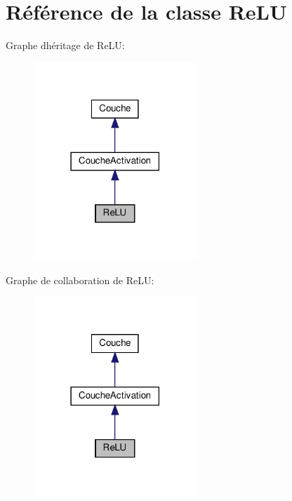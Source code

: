 \hypertarget{class_re_l_u}{}\section{Référence de la classe Re\+LU}
\label{class_re_l_u}


Graphe d\textquotesingle{}héritage de Re\+LU\+:\nopagebreak
\begin{figure}[H]
\begin{center}
\leavevmode
\includegraphics[width=174pt]{class_re_l_u__inherit__graph}
\end{center}
\end{figure}


Graphe de collaboration de Re\+LU\+:\nopagebreak
\begin{figure}[H]
\begin{center}
\leavevmode
\includegraphics[width=174pt]{class_re_l_u__coll__graph}
\end{center}
\end{figure}
